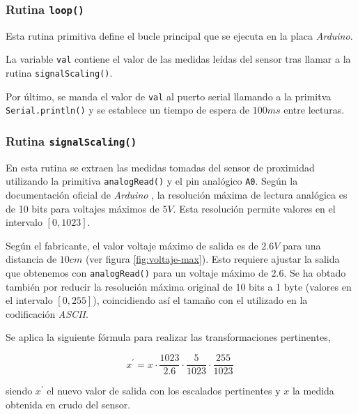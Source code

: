 \documentclass[10pt,a4paper]{report}
\begin{document}
	\subsubsection{Rutina \texttt{loop()}}
	Esta rutina primitiva define el bucle principal que se ejecuta en la placa \textit{Arduino}. 
	
	La variable \texttt{val} contiene el valor de las medidas leídas del sensor tras llamar a la rutina \texttt{signalScaling()}.
	
	Por último, se manda el valor de \texttt{val} al puerto serial llamando a la primitva \texttt{Serial.println()} y se establece un tiempo de espera de $100ms$ entre lecturas.
	
	
	
	\subsubsection{Rutina \texttt{signalScaling()}}
	En esta rutina se extraen las medidas tomadas del sensor de proximidad utilizando la primitiva \texttt{analogRead()} y el pin analógico \texttt{A0}. Según la documentación oficial de \textit{Arduino} \cite{resolucion-analogica}, la resolución máxima de lectura analógica es de 10 bits para voltajes máximos de $5V$. Esta resolución permite valores en el intervalo $[0, 1023]$.
	
	Según el fabricante, el valor voltaje máximo de salida es de $2.6V$ para una distancia de $10cm$ (ver figura \ref{fig:voltaje-max}). Esto requiere ajustar la salida que obtenemos con \texttt{analogRead()} para un voltaje máximo de $2.6$. Se ha obtado también por reducir la resolución máxima original de 10 bits a 1 byte (valores en el intervalo $[0, 255]$), coincidiendo así el tamaño con el utilizado en la codificación \textit{ASCII}.
	
	Se aplica la siguiente fórmula para realizar las transformaciones pertinentes,
	
	\begin{equation*}
		x^\prime = x \cdot \frac{1023}{2.6} \cdot \frac{5}{1023} \cdot \frac{255}{1023} \
	\end{equation*}
	
	siendo $x^\prime$ el nuevo valor de salida con los escalados pertinentes y $x$ la medida obtenida en crudo del sensor.
	
\end{document}
